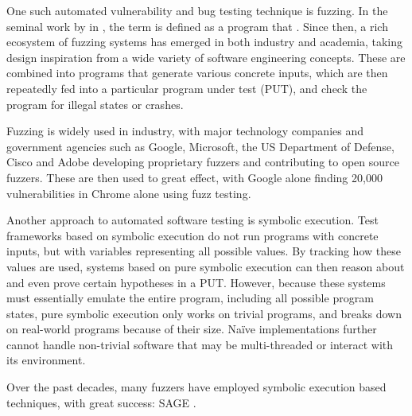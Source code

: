 \documentclass{article}
\begin{document}
\begin{multicols}{2}
    One such automated vulnerability and bug testing technique is fuzzing.\cite{VulnerabilityDiscoveryTechniques} In the seminal work by \citeauthor{UNIX} in \citeyear{UNIX}, the term  is defined as a program that \cite{UNIX}. Since then, a rich ecosystem of fuzzing systems has emerged in both industry and academia, taking design inspiration from a wide variety of software engineering concepts. These are combined into programs that generate various concrete inputs, which are then repeatedly fed into a particular program under test (PUT), and check the program for illegal states or crashes.\cite{EvaluatingFuzzTesting}

    Fuzzing is widely used in industry, with major technology companies and government agencies such as Google, Microsoft, the US Department of Defense, Cisco and Adobe developing proprietary fuzzers and contributing to open source fuzzers. These are then used to great effect, with Google alone finding 20,000 vulnerabilities in Chrome alone using fuzz testing.\cite{Demystifying}

    Another approach to automated software testing is symbolic execution\cite{Symbex}. Test frameworks based on symbolic execution do not run programs with concrete inputs, but with variables representing all possible values. By tracking how these values are used, systems based on pure symbolic execution can then reason about and even prove certain hypotheses in a PUT. However, because these systems must essentially emulate the entire program, including all possible program states, pure symbolic execution only works on trivial programs, and breaks down on real-world programs because of their size. Naïve implementations further cannot handle non-trivial software that may be multi-threaded or interact with its environment.

    Over the past decades, many fuzzers\cite{1dVul, AGLT, APLS, ASSIE, AUTOGRAM, Angora, BBRBP, BORG, BitBlaze, BugMiner, CESE, CORAL, CORALAVM, CRAXfuzz, CREST, CUTE, Chopped, Cinger, Cloud9, Cyberdyne, DART, DDCSE, DTSA, Darwin, DeepFuzz, DiSE, DigFuzz, Dowser, Driller, DrillerGo, EXE, Eclipser, FUZZOLIC, Fitnex, FloPSy, GRT, GSE, HCT, HFL, HigherOrderTestGeneration, HybridFuzzTesting, IFL, Intriguer, JFS, KATCH, KLEE, KLEEFP, LATEST, MATRIXRELOADED, MCSS, MEUZZ, Mayhem, MoWF, Moles, OpenDistributedPrograms, PFA, PYGMALION, Pangolin, Pex, QSYM, QuickFuzz, REDQUEEN, RWset, RaceDetection, S2E, SAGE, SAVIOR, SMART, SPIN, SRA, SYMFUZZ, ScalableAutomatedMethods, Stinger, TCR, TFuzz, TaintScope, VUzzer, WEIZZ} have employed symbolic execution based techniques, with great success: SAGE\cite{SAGE} \cite{FuzzingTheStateOfTheArt}.


\end{multicols}
\end{document}
